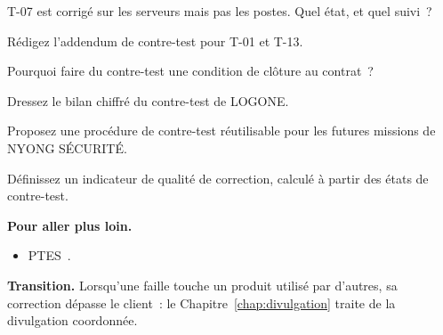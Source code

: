 \begin{boxexo}[title={\ding{45}\quad Exercice~23.5. Partiel \niveaumoyen}]
T-07 est corrigé sur les serveurs mais pas les postes. Quel état, et quel
suivi~?
\end{boxexo}

\begin{boxexo}[title={\ding{45}\quad Exercice~23.6. Addendum \niveaumoyen}]
Rédigez l'addendum de contre-test pour T-01 et T-13.
\end{boxexo}

\begin{boxexo}[title={\ding{45}\quad Exercice~23.7. Condition de clôture \niveaumoyen}]
Pourquoi faire du contre-test une condition de clôture au contrat~?
\end{boxexo}

\begin{boxexo}[title={\ding{45}\quad Exercice~23.8. Bilan \niveaumoyen}]
Dressez le bilan chiffré du contre-test de LOGONE.
\end{boxexo}

\begin{boxexo}[title={\ding{45}\quad Exercice~23.9. Procédure \niveauexpert}]
Proposez une procédure de contre-test réutilisable pour les futures missions
de NYONG SÉCURITÉ.
\end{boxexo}

\begin{boxexo}[title={\ding{45}\quad Exercice~23.10. Indicateur \niveauexpert}]
Définissez un indicateur de qualité de correction, calculé à partir des
états de contre-test.
\end{boxexo}

\bigskip

\begin{boxinfo}
\textbf{Pour aller plus loin.}
\begin{itemize}
    \item PTES~\cite{ptes}.
\end{itemize}
\end{boxinfo}

\begin{boxinfo}
\textbf{Transition.} Lorsqu'une faille touche un produit utilisé par
d'autres, sa correction dépasse le client~: le Chapitre~\ref{chap:divulgation}
traite de la divulgation coordonnée.
\end{boxinfo}

